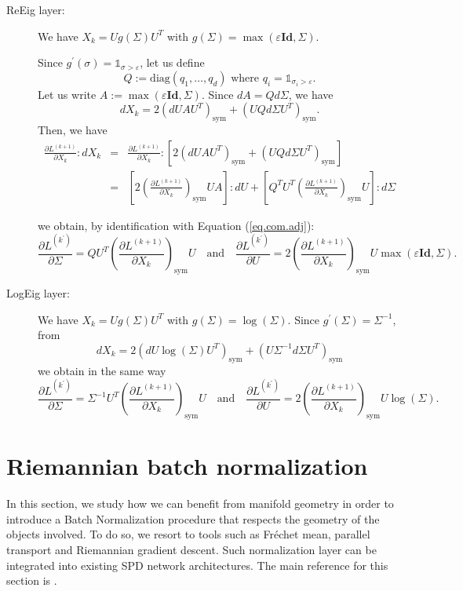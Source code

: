 \documentclass[10pt,a4paper]{book}
\theoremstyle{definition}
\theoremstyle{plain}
\theoremstyle{remark}
\newcommand{\Id}{\mathrm{\textbf{Id}}}
\begin{document}
\begin{description}
    \item[ReEig layer:] We have 
    $X_k=Ug(\Sigma) U^{T}$
    with $g(\Sigma)=\max(\varepsilon \Id,\Sigma)$. 
    
    Since $g^{\prime}(\sigma)=\mathds{1}_{\sigma>\varepsilon}$, let us define
     $$Q:=\text{diag}(q_1,\dots,q_d) \text{ where } q_i=\mathds{1}_{\sigma_i>\varepsilon}.$$
     Let us write $A:=\max(\varepsilon \Id,\Sigma)$. Since $dA=Qd\Sigma$, we have
    $$dX_{k}=2(dUAU^T)_{\text{sym}}+(UQd\Sigma U^{T})_{\text{sym}}.$$
    Then, we have
    \begin{eqnarray*}
    \frac{\partial L^{(k+1)}}{\partial X_k}:dX_k&=&\frac{\partial L^{(k+1)}}{\partial X_k}: \left[2(dU AU^T)_{\text{sym}}+(UQd\Sigma U^{T})_{\text{sym}}\right]\\
    &=&\left[2\left(\frac{\partial L^{(k+1)}}{\partial X_k}\right)_{\text{sym}}U A \right]: dU+ \left[Q^TU^T\left(\frac{\partial L^{(k+1)}}{\partial X_k}\right)_{\text{sym}}U\right]:d\Sigma
    \end{eqnarray*}
    
    we obtain, by identification with Equation (\ref{eq.com.adj}):
    $$\frac{\partial L^{(k^{\prime})}}{\partial \Sigma}=QU^T \left ( \frac{\partial L^{(k+1)}}{\partial X_k} \right )_{\text{sym}} U~~~ \text{ and }~~~
    \frac{\partial L^{(k^{\prime})}}{\partial U}=2\left ( \frac{\partial L^{(k+1)}}{\partial X_k} \right )_{\text{sym}} U \max(\varepsilon \Id, \Sigma).
    $$
    \item[LogEig layer:] We have 
    $X_k=Ug(\Sigma) U^{T}$
    with $g(\Sigma)=\log(\Sigma)$. 
    Since $g^{\prime}(\Sigma)=\Sigma^{-1}$, from
    $$dX_{k}=2(dU\log(\Sigma)U^{T})_{\text{sym}}+(U\Sigma^{-1}d\Sigma U^T)_{\text{sym}}$$
    we obtain in the same way
    $$
    \frac{\partial L^{(k^{\prime})}}{\partial \Sigma}=\Sigma^{-1}U^T \left ( \frac{\partial L^{(k+1)}}{\partial X_k} \right )_{\text{sym}} U~~~ \text{ and }~~~
    \frac{\partial L^{(k^{\prime})}}{\partial U}=2\left ( \frac{\partial L^{(k+1)}}{\partial X_k} \right )_{\text{sym}} U \log(\Sigma).
    $$
\end{description}



\section{Riemannian batch normalization}

In this section, we study how we can benefit from manifold geometry in order to introduce a Batch Normalization procedure that respects the geometry of the objects involved. 
To do so, we resort to tools such as Fréchet mean, parallel transport and Riemannian gradient descent. 
Such normalization layer can be integrated into existing SPD network architectures. 
The main reference for this section is \cite{brooks2019riemannian}.
\end{document}
